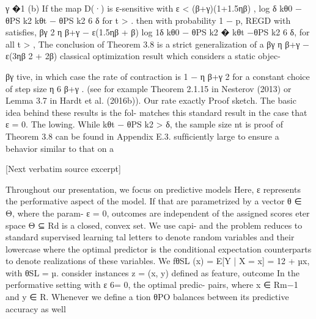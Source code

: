 \documentclass[10pt]{article}
\begin{document}
\begin{ReviewVerbatim}
                                                                                                                                 γ
                                               �1                             (b) If the map D(·) is ε-sensitive with ε < (β+γ)(1+1.5ηβ)  ,
                                         log    δ kθ0 − θPS k2
     kθt − θPS k2 6 δ for t >                                             .       then with probability 1 − p, REGD with satisﬁes,
                                          βγ          2
                                 η       β+γ − ε(1.5ηβ + β)
                                                                                                                    log 1δ kθ0 − θPS k2
                                                                                                                        �
                                                                                  kθt −θPS k2 6 δ, for all t >                              ,
The conclusion of Theorem 3.8 is a strict generalization of a                                                        βγ
                                                                                                                 η β+γ    − ε(3ηβ 2 + 2β)
classical optimization result which considers a static objec-

                                                        βγ
tive, in which case the rate of contraction is 1 − η β+γ                                                                   2
                                                                                   for a constant choice of step size η 6 β+γ .
(see for example Theorem 2.1.15 in Nesterov (2013) or
Lemma 3.7 in Hardt et al. (2016b)). Our rate exactly                          Proof sketch. The basic idea behind these results is the fol-
matches this standard result in the case that ε = 0. The                      lowing. While kθt − θPS k2 > δ, the sample size nt is
proof of Theorem 3.8 can be found in Appendix E.3.                            sufﬁciently large to ensure a behavior similar to that on a

[Next verbatim source excerpt]

Throughout our presentation, we focus on predictive models        Here, ε represents the performative aspect of the model. If
that are parametrized by a vector θ ∈ Θ, where the param-         ε = 0, outcomes are independent of the assigned scores
eter space Θ ⊆ Rd is a closed, convex set. We use capi-           and the problem reduces to standard supervised learning
tal letters to denote random variables and their lowercase        where the optimal predictor is the conditional expectation
counterparts to denote realizations of these variables. We        fθSL (x) = E[Y | X = x] = 12 + µx, with θSL = µ.
consider instances z = (x, y) deﬁned as feature, outcome          In the performative setting with ε 6= 0, the optimal predic-
pairs, where x ∈ Rm−1 and y ∈ R. Whenever we deﬁne a              tion θPO balances between its predictive accuracy as well


\end{ReviewVerbatim}
\end{document}
